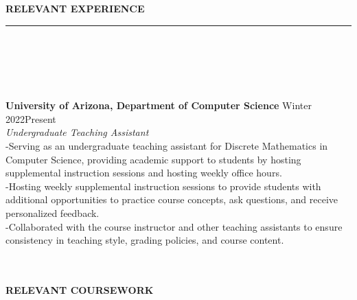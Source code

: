 \documentclass[10pt]{book}
\begin{document}
{        %
        \begin{spacing}{0.2}
            {
                \noindent\fontsize{12}{12}
                \\
                \\
                \selectfont\textbf{RELEVANT EXPERIENCE}
                \\
            }
            \rule{\linewidth}{0.4pt}
            \\
            \\
            \\
            \\
        \end{spacing}
        {
            \noindent\fontsize{11}{11}
            \selectfont\hspace{-3pt}\textbf{University of Arizona, Department of Computer Science \textendash}\hfill Winter 2022\hspace{3pt}\textendash\hspace{3pt}Present
        }
        \\
        \textit{Undergraduate Teaching Assistant}
        \\
        \hspace{2pt}-\hspace{6pt}Serving as an undergraduate teaching assistant for Discrete Mathematics in Computer Science, providing academic support to students by hosting supplemental 
                                instruction sessions and hosting weekly office hours.
        \\
        \hspace{2pt}-\hspace{6pt}Hosting weekly supplemental instruction sessions to provide students with additional opportunities to practice course concepts, ask questions, 
                                and receive personalized feedback.
        \\
        \hspace{2pt}-\hspace{6pt}Collaborated with the course instructor and other teaching assistants to ensure consistency in teaching style, grading policies, and course content.
        \begin{spacing}{0.2}
            {
                \noindent\fontsize{12}{12}
                \\
                \\
                \selectfont\textbf{RELEVANT COURSEWORK}
}
\end{spacing}}
\end{document}
